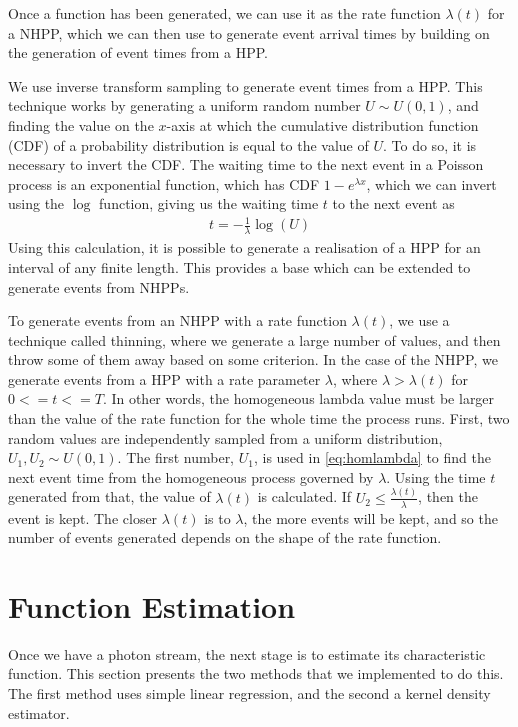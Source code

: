\documentclass[a4paper,11pt]{article}
\begin{document}
   Once a function has been generated, we can use it as the rate function
   $\lambda(t)$ for a NHPP, which we can then use to generate event arrival
   times by building on the generation of event times from a HPP.

   We use inverse transform sampling to generate event times from a HPP. This
   technique works by generating a uniform random number $U\sim U(0,1)$, and
   finding the value on the $x$-axis at which the cumulative distribution
   function (CDF) of a probability distribution is equal to the value of $U$. To
   do so, it is necessary to invert the CDF. The waiting time to the next event
   in a Poisson process is an exponential function, which has CDF $1-e^{\lambda
   x}$, which we can invert using the $\log$ function, giving us the
   waiting time $t$ to the next event as \cite{1998art}
   \begin{align}\label{eq:homlambda}
   t=-\frac{1}{\lambda}\log(U)
   \end{align}
   Using this calculation, it is possible to generate a realisation of a HPP for
   an interval of any finite length. This provides a base which can be extended
   to generate events from NHPPs.
   
   To generate events from an NHPP with a rate function $\lambda(t)$, we use a
   technique called thinning, where we generate a large number of values, and
   then throw some of them away based on some criterion. In the case of the
   NHPP, we generate events from a HPP with a rate parameter $\lambda$, where
   $\lambda>\lambda(t)$ for $0<=t<=T$. In other words, the homogeneous lambda
   value must be larger than the value of the rate function for the whole time
   the process runs. First, two random values are independently sampled from a
   uniform distribution, $U_1,U_2\sim U(0,1)$. The first number, $U_1$, is used
   in \eqref{eq:homlambda} to find the next event time from the homogeneous
   process governed by $\lambda$. Using the time $t$ generated from that, the
   value of $\lambda(t)$ is calculated. If $U_2\leq\frac{\lambda(t)}{\lambda}$,
   then the event is kept. The closer $\lambda(t)$ is to $\lambda$, the more
   events will be kept, and so the number of events generated depends on the
   shape of the rate function.
\section{Function Estimation}
\label{sec-4}

  Once we have a photon stream, the next stage is to estimate its characteristic
  function. This section presents the two methods that we implemented to do
  this. The first method uses simple linear regression, and the second a kernel
  density estimator.
\end{document}
